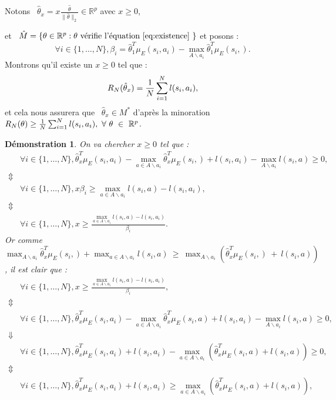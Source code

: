 \documentclass[publibook-draft]{CAp2012}
\newtheorem{preuve}{Démonstration}
\begin{document}
Notons ~$\hat{\theta}_x=x\frac{\hat{\theta}}{\|\hat{\theta}\|_2}\in\mathbb{R}^p$ avec $x\geq0$,{ et ~$\hat{M}=\{\theta\in\mathbb{R}^p:\theta \text{ vérifie l'équation \eqref{eq:existence} }  \}$ et posons :
\begin{equation}
\forall i\in\{1,\dots,N\}, \beta_i=\hat{\theta}_1^T\mu_E(s_i,a_i)-\max_{A \backslash a_i}\hat{\theta}_1^T\mu_E(s_i,).
\end{equation}
Montrons qu'il existe un $x\geq0$ tel que :
\begin{equation}
R_N(\hat{\theta}_x)= {1\over N} \sum_{i=1}^N l(s_i,a_i),
\end{equation}
et cela nous assurera que ~$\hat{\theta}_x\in M^*$ d'après la minoration ~$R_N(\theta)\geq {1\over N} \sum_{i=1}^Nl(s_i,a_i),~\forall~\theta~\in~\mathbb{R}^p$.
\begin{preuve}
On va chercher $x\geq0$ tel que :
\begin{align}
&\forall i\in\{1,\dots,N\}, \hat{\theta}_x^T\mu_E(s_i,a_i)-\max_{a\in A \backslash a_i}\hat{\theta}_x^T\mu_E(s_i,) + l(s_i,a_i)-\max_{A \backslash a_i}l(s_i,a)\geq0,
\\
\nonumber\Updownarrow
\\
&\forall i\in\{1,\dots,N\}, x\beta_i \geq\max_{a\in A \backslash a_i}l(s_i,a)-l(s_i,a_i),
\\
\nonumber\Updownarrow
\\
&\forall i\in\{1,\dots,N\}, x\geq\frac{\max_{a\in A \backslash a_i}l(s_i,a)-l(s_i,a_i)}{\beta_i}.
\end{align}
Or comme ~$\max_{A \backslash a_i}\hat{\theta}_x^T\mu_E(s_i,)+\max_{a\in A \backslash a_i}l(s_i,a)~\geq~\max_{A \backslash a_i}(\hat{\theta}_x^T\mu_E(s_i,)~+~l(s_i,a))$, il est clair que :
\begin{align}
&\forall i\in\{1,\dots,N\}, x\geq\frac{\max_{a\in A \backslash a_i}l(s_i,a)-l(s_i,a_i)}{\beta_i},
\\
\nonumber\Updownarrow
\\
&\forall i\in\{1,\dots,N\}, \hat{\theta}_x^T\mu_E(s_i,a_i)-\max_{a \in A \backslash a_i}\hat{\theta}_x^T\mu_E(s_i,a) + l(s_i,a_i)-\max_{A \backslash a_i}l(s_i,a)\geq0,
\\
\nonumber\Downarrow
\\
&\forall i\in\{1,\dots,N\}, \hat{\theta}_x^T\mu_E(s_i,a_i) + l(s_i,a_i)-\max_{a \in A  \backslash a_i}(\hat{\theta}_x^T\mu_E(s_i,a)+l(s_i,a))\geq0,
\\
\nonumber\Updownarrow
\\
&\forall i\in\{1,\dots,N\}, \hat{\theta}_x^T\mu_E(s_i,a_i) + l(s_i,a_i)\geq\max_{a \in A \backslash a_i}(\hat{\theta}_x^T\mu_E(s_i,a)+l(s_i,a)),

\end{align}
\end{preuve}}
\end{document}
